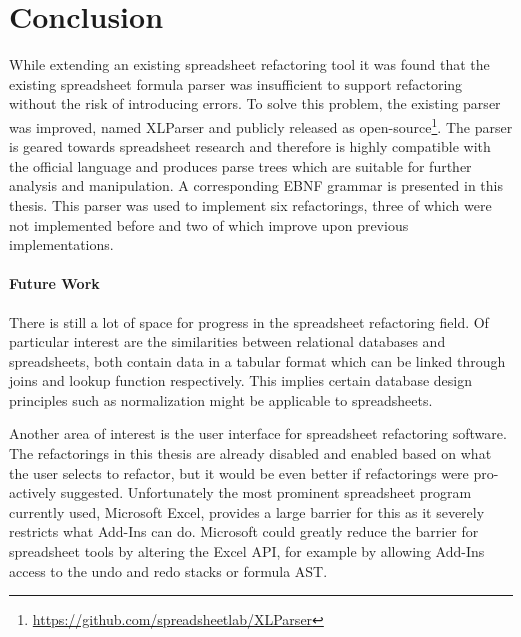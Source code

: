
\chapter{Conclusion}
\label{chapter:conclusion}

While extending an existing spreadsheet refactoring tool it was found that the existing spreadsheet formula parser was insufficient to support refactoring without the risk of introducing errors.
To solve this problem, the existing parser was improved, named XLParser and publicly released as open-source\footnote{\url{https://github.com/spreadsheetlab/XLParser}}.
The parser is geared towards spreadsheet research and therefore is highly compatible with the official language and produces parse trees which are suitable for further analysis and manipulation.
A corresponding EBNF grammar is presented in this thesis.
This parser was used to implement six refactorings, three of which were not implemented before and two of which improve upon previous implementations.

\subsubsection{Future Work}

There is still a lot of space for progress in the spreadsheet refactoring field.
Of particular interest are the similarities between relational databases and spreadsheets, both contain data in a tabular format which can be linked through joins and lookup function respectively.
This implies certain database design principles such as normalization might be applicable to spreadsheets.

Another area of interest is the user interface for spreadsheet refactoring software.
The refactorings in this thesis are already disabled and enabled based on what the user selects to refactor, but it would be even better if refactorings were pro-actively suggested. 
Unfortunately the most prominent spreadsheet program currently used, Microsoft Excel, provides a large barrier for this as it severely restricts what Add-Ins can do.
Microsoft could greatly reduce the barrier for spreadsheet tools by altering the Excel API, for example by allowing Add-Ins access to the undo and redo stacks or formula AST.
